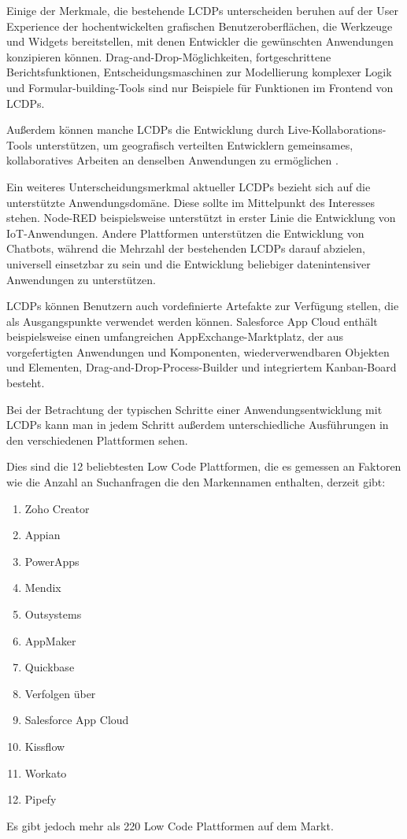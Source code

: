 \documentclass[12pt]{article} %
\begin{document}
	Einige der Merkmale, die bestehende LCDPs unterscheiden beruhen auf der User Experience der hochentwickelten grafischen Benutzeroberflächen, die Werkzeuge und Widgets bereitstellen, mit denen Entwickler die gewünschten Anwendungen konzipieren können. Drag-and-Drop-Möglichkeiten, fortgeschrittene Berichtsfunktionen, Entscheidungsmaschinen zur Modellierung komplexer Logik und Formular-building-Tools sind nur Beispiele für Funktionen im Frontend von LCDPs. \autocite{DiRuscio.2022} \newline
	
	Außerdem können manche LCDPs die Entwicklung durch Live-Kollaborations-Tools unterstützen, um geografisch verteilten Entwicklern gemeinsames, kollaboratives Arbeiten an denselben Anwendungen zu ermöglichen \autocite{DiRuscio.2022}. \newline
	
	Ein weiteres Unterscheidungsmerkmal aktueller LCDPs bezieht sich auf die unterstützte Anwendungsdomäne. Diese sollte im Mittelpunkt des Interesses stehen. Node-RED beispielsweise unterstützt in erster Linie die Entwicklung von IoT-Anwendungen. Andere Plattformen unterstützen die Entwicklung von Chatbots, während die Mehrzahl der bestehenden LCDPs darauf abzielen, universell einsetzbar zu sein und die Entwicklung beliebiger datenintensiver Anwendungen zu unterstützen. \autocite{DiRuscio.2022} \newline
	
	LCDPs können Benutzern auch vordefinierte Artefakte zur Verfügung stellen, die als Ausgangspunkte verwendet werden können. Salesforce App Cloud enthält beispielsweise einen umfangreichen AppExchange-Marktplatz, der aus vorgefertigten Anwendungen und Komponenten, wiederverwendbaren Objekten und Elementen, Drag-and-Drop-Process-Builder und integriertem Kanban-Board besteht. \autocite{DiRuscio.2022} \newline
	
	Bei der Betrachtung der typischen Schritte einer Anwendungsentwicklung mit LCDPs kann man in jedem Schritt außerdem unterschiedliche Ausführungen in den verschiedenen Plattformen sehen. \newline
	
	Dies sind die 12 beliebtesten Low Code Plattformen, die es gemessen an Faktoren wie die Anzahl an Suchanfragen die den Markennamen enthalten, derzeit gibt: 
	\begin{enumerate}
	\item Zoho Creator
	\item Appian
	\item PowerApps
	\item Mendix
	\item Outsystems
	\item AppMaker
	\item Quickbase
	\item Verfolgen über
	\item Salesforce App Cloud
	\item Kissflow
	\item Workato
	\item Pipefy
	\end{enumerate}
	Es gibt jedoch mehr als 220 Low Code Plattformen auf dem Markt. \autocite{KevinShuler.2023}
	
\end{document}
